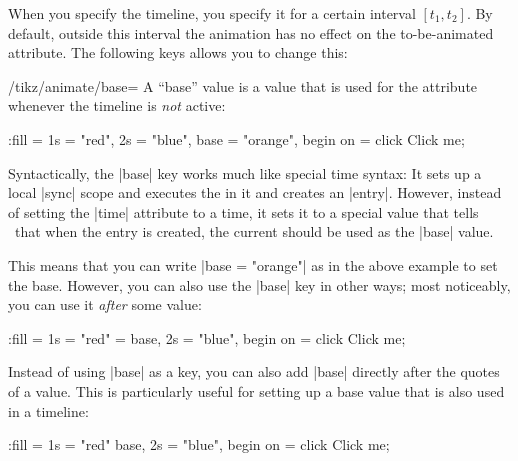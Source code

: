 When you specify the timeline, you specify it for a certain interval
$[t_1,t_2]$. By default, outside this interval the animation has no effect on
the to-be-animated attribute. The following keys allows you to change this:

\begin{key}{/tikz/animate/base=}
    A ``base'' value is a value that is used for the attribute whenever the
    timeline is \emph{not} active:
\begin{codeexample}[imagesource={standalone/pgfmanual-en-tikz-animations-animation-52.svg}]
\tikz \node [fill = green, text = white] :fill =
    { 1s = "red", 2s = "blue", base = "orange", begin on = click }
  {Click me};
\end{codeexample}

    Syntactically, the |base| key works much like special time syntax: It sets
    up a local |sync| scope and executes the  in it and creates
    an |entry|. However, instead of setting the |time| attribute to a time, it
    sets it to a special value that tells \tikzname\ that when the entry is
    created, the current  should be used as the |base| value.

    This means that you can write |base = "orange"| as in the above example to
    set the base. However, you can also use the |base| key in other ways; most
    noticeably, you can use it \emph{after} some value:
\begin{codeexample}[imagesource={standalone/pgfmanual-en-tikz-animations-animation-53.svg}]
\tikz \node [fill = green, text = white] :fill =
    { 1s = {"red" = base}, 2s = "blue", begin on = click }
  {Click me};
\end{codeexample}

    Instead of using |base| as a key, you can also add |base| directly after
    the quotes of a value. This is particularly useful for setting up a base
    value that is also used in a timeline:
\begin{codeexample}[imagesource={standalone/pgfmanual-en-tikz-animations-animation-54.svg}]
\tikz \node [fill = green, text = white] :fill =
    { 1s = "red" base, 2s = "blue", begin on = click }
  {Click me};
\end{codeexample}
\end{key}

